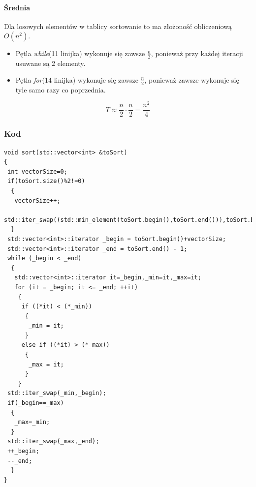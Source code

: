 \paragraph{Średnia}
Dla losowych elementów w tablicy sortowanie to ma złożoność obliczeniową $O(n^2)$.
\begin{itemize}
\item Pętla \textit{while}(11 linijka) wykonuje się zawsze $\frac{n}{2}$, ponieważ przy każdej iteracji usuwane są 2 elementy.
\item Pętla \textit{for}(14 linijka) wykonuje się zawsze $\frac{n}{2}$, ponieważ zawsze wykonuje się tyle samo razy co poprzednia.
\end{itemize}

\begin{equation*}
T \approx \frac{n}{2} \cdot \frac{n}{2} = \frac{n^2}{4}
\end{equation*}
\wyjT


\subsubsection{Kod}
\begin{lstlisting}[caption={Sortowanie przez wybieranie dla par},label={lst:wybieranie}]
void sort(std::vector<int> &toSort)
{
 int vectorSize=0;
 if(toSort.size()%2!=0)
  {
   vectorSize++;
   std::iter_swap((std::min_element(toSort.begin(),toSort.end())),toSort.begin());
  }
 std::vector<int>::iterator _begin = toSort.begin()+vectorSize;
 std::vector<int>::iterator _end = toSort.end() - 1;
 while (_begin < _end)
  {
   std::vector<int>::iterator it=_begin,_min=it,_max=it;
   for (it = _begin; it <= _end; ++it)
    {
     if ((*it) < (*_min))
      {
       _min = it;
      }
     else if ((*it) > (*_max))
      {
       _max = it;
      }
    }
 std::iter_swap(_min,_begin);
 if(_begin==_max)
  {
   _max=_min;
  }
 std::iter_swap(_max,_end);
 ++_begin;
 --_end;
  }
}
\end{lstlisting}


